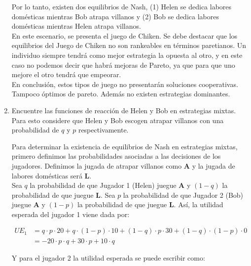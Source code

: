 \documentclass{exam}
\begin{document}
\begin{enumerate}[resume*]
\begin{solution}
\begin{center}
\end{center}
Por lo tanto, existen dos equilibrios de Nash, (1) Helen se dedica labores domésticas mientras Bob atrapa villanos y (2)  Bob se dedica labores domésticas mientras Helen atrapa villanos.\\

En este escenario, se presenta el juego de Chiken. Se debe destacar que los equilibrios del Juego de Chiken no son rankeables en términos paretianos. Un individuo siempre tendrá como mejor estrategia la opuesta al otro, y en este caso no podemos decir que habrá  mejoras de Pareto, ya que para que uno mejore el otro tendrá que empeorar.\\

En conclusión, estos tipos de juego no presentarán soluciones cooperativas.  Tampoco óptimos de pareto. Además no existen estrategias dominantes.
    \end{solution}
    
    \item Encuentre las funciones de reacción de Helen y Bob en estrategias mixtas. Para esto considere que Helen y Bob escogen atrapar villanos con una probabilidad de $q$ y $p$ respectivamente.
    \begin{solution}
    

Para determinar la existencia de equilibrios de Nash en estrategias mixtas, primero definimos las probabilidades asociadas a las decisiones de los jugadores. Definimos la jugada de atrapar villanos como \textbf{A} y la jugada de labores domésticas será \textbf{L}. \\

Sea $q$ la probabilidad de que Jugador 1 (Helen) juegue \textbf{A} y $(1-q)$ la probabilidad de que juegue \textbf{L}. Sea $p$ la probabilidad de que Jugador 2 (Bob) juegue \textbf{A} y $(1-p)$ la probabilidad de que juegue \textbf{L}. Así, la utilidad esperada del jugador 1 viene dada por:

 \begin{align*}
  UE_1 &= q \cdot p \cdot 20 + q \cdot (1-p) \cdot 10 + (1-q)\cdot p \cdot 30 + (1-q) \cdot (1-p) \cdot 0 \\
    &= -20\cdot p \cdot q +30 \cdot p + 10\cdot q
\end{align*}

Y para el jugador 2 la utilidad esperada se puede escribir como:


\end{solution}
\end{enumerate}
\end{document}
